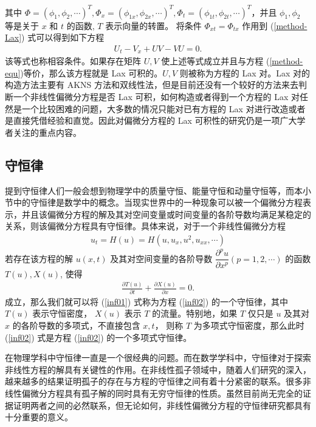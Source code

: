 其中 $\Phi=(\phi_1, \phi_2, \cdots)^T, \Phi_x=(\phi_{1x}, \phi_{2x}, \cdots)^T, \Phi_t=(\phi_{1t}, \phi_{2t}, \cdots)^T$，并且 $\phi_1, \phi_2$ 等是关于 $x$ 和 $t$ 的函数, $T$ 表示向量的转置。 将条件 $\Phi_{xt}=\Phi_{tx}$ 作用到 (\ref{method-Lax}) 式可以得到如下方程
\begin{align}
U_t-V_x+UV-VU=0.
\end{align}
该等式也称相容条件。如果存在矩阵 $U, V$ 使上述等式成立并且与方程 (\ref{method-equ})等价，那么该方程就是  Lax 可积的。$U, V$ 则被称为方程的 Lax 对。Lax 对的构造方法主要有  AKNS 方法和双线性法，但是目前还没有一个较好的方法来去判断一个非线性偏微分方程是否 Lax 可积，如何构造或者得到一个方程的 Lax 对任然是一个比较困难的问题，大多数的情况只能对已有方程的 Lax 对进行改造或者是直接凭借经验和直觉。因此对偏微分方程的 Lax 可积性的研究仍是一项广大学者关注的重点内容。

\subsection{守恒律}
提到守恒律人们一般会想到物理学中的质量守恒、能量守恒和动量守恒等，而本小节中的守恒律是数学中的概念。当现实世界中的一种现象可以被一个偏微分方程表示，并且该偏微分方程的解及其对空间变量或时间变量的各阶导数均满足某稳定的关系，则该偏微分方程具有守恒律。具体来说，对于一个非线性偏微分方程
\begin{align}
u_t = H(u) =  H(u, u_x, u^2,u_{xx}, \cdots)\label{inf02}
\end{align}
若存在该方程的解  $u(x, t)$ 及其对空间变量的各阶导数 $\dfrac{\partial^pu}{\partial x^p}(p=1,2,\cdots)$ 的函数 $T(u), X(u)$, 使得
\begin{align}
\frac{\partial T(u)}{\partial t}+\frac{\partial X(u)}{\partial x}=0. \label{inf01}
\end{align}
成立，那么我们就可以将 (\ref{inf01}) 式称为方程 (\ref{inf02}) 的一个守恒律，其中 $T(u)$ 表示守恒密度， $X(u)$ 表示 $T$ 的流量。特别地，如果 $T$ 仅只是 $u$ 及其对 $x$ 的各阶导数的多项式，不直接包含 $x, t$， 则称 $T$ 为多项式守恒密度，那么此时 (\ref{inf02}) 式是方程 (\ref{inf02}) 的一个多项式守恒律。

在物理学科中守恒律一直是一个很经典的问题。而在数学学科中，守恒律对于探索非线性方程的解具有关键性的作用。在非线性孤子领域中，随着人们研究的深入，越来越多的结果证明孤子的存在与方程的守恒律之间有着十分紧密的联系。很多非线性偏微分方程具有孤子解的同时具有无穷守恒律的性质。虽然目前尚无完全的证据证明两者之间的必然联系，但无论如何，非线性偏微分方程的守恒律研究都具有十分重要的意义。


